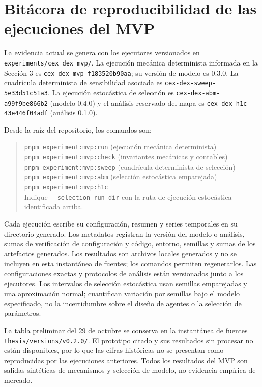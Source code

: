 \section{Bitácora de reproducibilidad de las ejecuciones del MVP}

La evidencia actual se genera con los ejecutores versionados en
\texttt{experiments/cex\_dex\_mvp/}. La ejecución mecánica determinista informada en
la Sección 3 es \texttt{cex-dex-mvp-f183520b90aa}; su versión de modelo es 0.3.0. La
cuadrícula determinista de sensibilidad asociada es
\texttt{cex-dex-sweep-5e33d51c51a3}. La ejecución estocástica de selección es
\texttt{cex-dex-abm-a99f9be866b2} (modelo 0.4.0) y el análisis reservado del mapa es
\texttt{cex-dex-h1c-43e446f04adf} (análisis 0.1.0).

Desde la raíz del repositorio, los comandos son:

\begin{quote}
\texttt{pnpm experiment:mvp:run} (ejecución mecánica determinista)\\
\texttt{pnpm experiment:mvp:check} (invariantes mecánicas y contables)\\
\texttt{pnpm experiment:mvp:sweep} (cuadrícula determinista de selección)\\
\texttt{pnpm experiment:mvp:abm} (selección estocástica emparejada)\\
\texttt{pnpm experiment:mvp:h1c}\\
Indique \texttt{-{}-selection-run-dir} con la ruta de ejecución estocástica identificada arriba.
\end{quote}

Cada ejecución escribe su configuración, resumen y series temporales en su directorio
generado. Los metadatos registran la versión del
modelo o análisis, sumas de verificación de configuración y código, entorno, semillas
y sumas de los artefactos generados. Los resultados son archivos locales generados y no
se incluyen en esta instantánea de fuentes; los comandos permiten regenerarlos. Las
configuraciones exactas y protocolos de análisis están versionados junto a los
ejecutores. Los intervalos de selección estocástica usan semillas emparejadas y una
aproximación normal; cuantifican variación por semillas bajo el modelo especificado, no
la incertidumbre sobre el diseño de agentes o la selección de parámetros.

La tabla preliminar del 29 de octubre se conserva en la instantánea de fuentes
\texttt{thesis/versions/v0.2.0/}. El prototipo citado y sus resultados sin procesar no
están disponibles, por lo que las cifras históricas no se presentan como reproducidas
por las ejecuciones anteriores. Todos los resultados del MVP son salidas sintéticas de
mecanismos y selección de modelo, no evidencia empírica de mercado.

